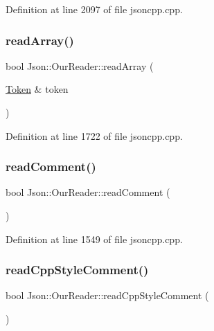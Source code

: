 Definition at line 2097 of file jsoncpp.\+cpp.

\hypertarget{class_json_1_1_our_reader_a0b9f58faf4212c6ecb5d8e2a1ac10257}{}\label{class_json_1_1_our_reader_a0b9f58faf4212c6ecb5d8e2a1ac10257} 
\subsubsection{\texorpdfstring{read\+Array()}{readArray()}}
{\footnotesize\ttfamily bool Json\+::\+Our\+Reader\+::read\+Array (\begin{DoxyParamCaption}\item[{\hyperlink{class_json_1_1_our_reader_1_1_token}{Token} \&}]{token }\end{DoxyParamCaption})\hspace{0.3cm}{\ttfamily [private]}}



Definition at line 1722 of file jsoncpp.\+cpp.

\hypertarget{class_json_1_1_our_reader_a90f6bb9e55b2bc3d6c1880809495c222}{}\label{class_json_1_1_our_reader_a90f6bb9e55b2bc3d6c1880809495c222} 
\subsubsection{\texorpdfstring{read\+Comment()}{readComment()}}
{\footnotesize\ttfamily bool Json\+::\+Our\+Reader\+::read\+Comment (\begin{DoxyParamCaption}{ }\end{DoxyParamCaption})\hspace{0.3cm}{\ttfamily [private]}}



Definition at line 1549 of file jsoncpp.\+cpp.

\hypertarget{class_json_1_1_our_reader_ae3de80671f0f997053e1c1c8a47a45c5}{}\label{class_json_1_1_our_reader_ae3de80671f0f997053e1c1c8a47a45c5} 
\subsubsection{\texorpdfstring{read\+Cpp\+Style\+Comment()}{readCppStyleComment()}}
{\footnotesize\ttfamily bool Json\+::\+Our\+Reader\+::read\+Cpp\+Style\+Comment (\begin{DoxyParamCaption}{ }\end{DoxyParamCaption})\hspace{0.3cm}{\ttfamily [private]}}



